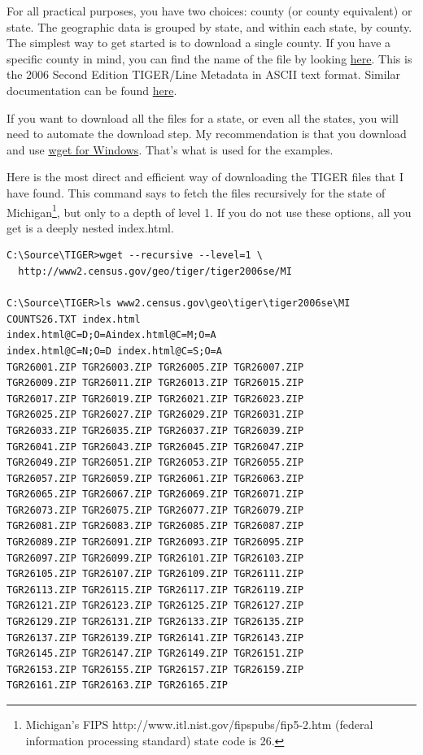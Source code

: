 \documentclass[11pt,letterpaper,onecolumn,twoside,openright,final]{report}
\begin{document}
For all practical purposes, you have two choices: county (or county equivalent) or state.
The geographic data is grouped by state, and within each state, by county.
The simplest way to get started is to download a single county.
If you have a specific county in mind, you can find the name of the file by looking \href{http://www.census.gov/geo/tigerline/app\_a03.txt}{here}.
This is the 2006 Second Edition TIGER/Line Metadata in ASCII text format.
Similar documentation can be found \href{http://www.census.gov/geo/www/tiger/tiger2006se/a6seapa.txt}{here}.

If you want to download all the files for a state, or even all the states, you will need to automate the download step.
My recommendation is that you download and use \href{http://users.ugent.be/~bpuype/wget/}{wget for Windows}.
That's what is used for the examples.

Here is the most direct and efficient way of downloading the TIGER files that I have found.
This command says to fetch the files recursively for the state of Michigan\footnote{Michigan's FIPS http://www.itl.nist.gov/fipspubs/fip5-2.htm (federal information processing standard) state code is 26.}, but only to a depth of level 1.
If you do not use these options, all you get is a deeply nested index.html.

\begin{verbatim}
C:\Source\TIGER>wget --recursive --level=1 \
  http://www2.census.gov/geo/tiger/tiger2006se/MI

C:\Source\TIGER>ls www2.census.gov\geo\tiger\tiger2006se\MI
COUNTS26.TXT index.html
index.html@C=D;O=Aindex.html@C=M;O=A
index.html@C=N;O=D index.html@C=S;O=A
TGR26001.ZIP TGR26003.ZIP TGR26005.ZIP TGR26007.ZIP
TGR26009.ZIP TGR26011.ZIP TGR26013.ZIP TGR26015.ZIP
TGR26017.ZIP TGR26019.ZIP TGR26021.ZIP TGR26023.ZIP
TGR26025.ZIP TGR26027.ZIP TGR26029.ZIP TGR26031.ZIP
TGR26033.ZIP TGR26035.ZIP TGR26037.ZIP TGR26039.ZIP
TGR26041.ZIP TGR26043.ZIP TGR26045.ZIP TGR26047.ZIP
TGR26049.ZIP TGR26051.ZIP TGR26053.ZIP TGR26055.ZIP
TGR26057.ZIP TGR26059.ZIP TGR26061.ZIP TGR26063.ZIP
TGR26065.ZIP TGR26067.ZIP TGR26069.ZIP TGR26071.ZIP
TGR26073.ZIP TGR26075.ZIP TGR26077.ZIP TGR26079.ZIP
TGR26081.ZIP TGR26083.ZIP TGR26085.ZIP TGR26087.ZIP
TGR26089.ZIP TGR26091.ZIP TGR26093.ZIP TGR26095.ZIP
TGR26097.ZIP TGR26099.ZIP TGR26101.ZIP TGR26103.ZIP
TGR26105.ZIP TGR26107.ZIP TGR26109.ZIP TGR26111.ZIP
TGR26113.ZIP TGR26115.ZIP TGR26117.ZIP TGR26119.ZIP
TGR26121.ZIP TGR26123.ZIP TGR26125.ZIP TGR26127.ZIP
TGR26129.ZIP TGR26131.ZIP TGR26133.ZIP TGR26135.ZIP
TGR26137.ZIP TGR26139.ZIP TGR26141.ZIP TGR26143.ZIP
TGR26145.ZIP TGR26147.ZIP TGR26149.ZIP TGR26151.ZIP
TGR26153.ZIP TGR26155.ZIP TGR26157.ZIP TGR26159.ZIP
TGR26161.ZIP TGR26163.ZIP TGR26165.ZIP
\end{verbatim}
\end{document}
